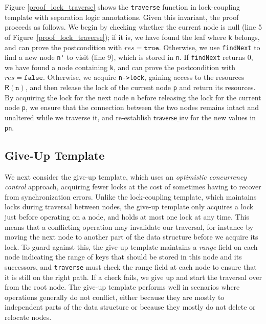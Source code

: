 \documentclass[a4paper,UKenglish,cleveref, autoref, thm-restate]{lipics-v2021}
\newcommand{\wm}[1]{\textbf{\textcolor{violet}{[William: #1]}}}
\begin{document}
Figure \ref{proof_lock_traverse} shows the \texttt{traverse} function in lock-coupling template with separation logic annotations. Given this invariant, the proof proceeds as follows. %
We begin by checking whether the current node is null (line 5 of Figure~\ref{proof_lock_traverse}); if it is, we have found the leaf where \lstinline{k} belongs, and can prove the postcondition with $\mathit{res} = \texttt{true}$. Otherwise, we use \lstinline{findNext} to find a new node \lstinline{n'} to visit (line 9), which is stored in \lstinline{n}. If \lstinline{findNext} returns 0, we have found a node containing \lstinline{k}, and can prove the postcondition with $\mathit{res} = \mathtt{false}$. Otherwise, we acquire \lstinline{n->lock}, gaining access to the resources $\mathsf{R}(\texttt{n})$, and then release the lock of the current node \texttt{p} and return its resources. %
By acquiring the lock for the next node \texttt{n} before releasing the lock for the current node \texttt{p}, we ensure that the connection between the two nodes remains intact and unaltered while we traverse it, and re-establish $\mathsf{traverse\_inv}$ for the new values in \lstinline{pn}. 


\subsection{Give-Up Template}
\label{give-up-algo}

We next consider the give-up template, which uses an \emph{optimistic concurrency control} approach, acquiring fewer locks at the cost of sometimes having to recover from synchronization errors. Unlike the lock-coupling template, which maintains locks during traversal between nodes, the give-up template only acquires a lock just before operating on a node, and holds at most one lock at any time. This means that a conflicting operation may invalidate our traversal, for instance by moving the next node to another part of the data structure before we acquire its lock. To guard against this, the give-up template maintains a \emph{range} field on each node indicating the range of keys that should be stored in this node and its successors, and \lstinline{traverse} must check the range field at each node to ensure that it is still on the right path. If a check fails, we give up and start the traversal over from the root node. The give-up template performs well in scenarios where operations generally do not conflict, either because they are mostly to independent parts of the data structure or because they mostly do not delete or relocate nodes.
\end{document}
